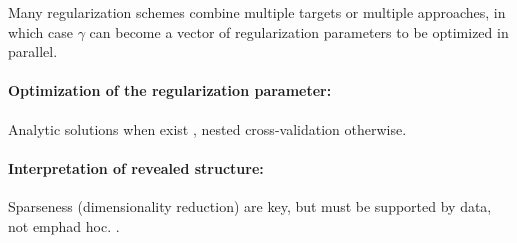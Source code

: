 Many regularization schemes combine multiple targets or multiple approaches, in which case $\gamma$ can become a vector of regularization parameters \citep{Schafer:2005,Fan:2011,Ma:2013} to be optimized in parallel.

\paragraph{Optimization of the regularization parameter:}
Analytic solutions when exist \citep{Ledoit:2004,Schafer:2005}, nested cross-validation otherwise.

\paragraph{Interpretation of revealed structure:}
Sparseness (dimensionality reduction) are key, but must be supported by data, not emph{ad hoc}. \citep{Fan:2006,Malmersjo:2013}.

